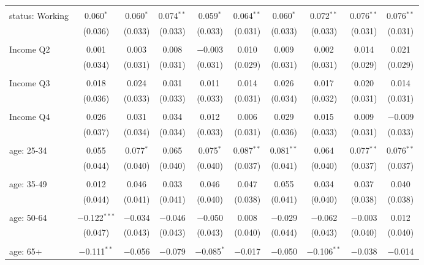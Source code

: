 \begin{tabular}{@{\extracolsep{5pt}}lccccccccc}
  & & & & & & & & & \\ 
 status: Working & 0.060$^{*}$ & 0.060$^{*}$ & 0.074$^{**}$ & 0.059$^{*}$ & 0.064$^{**}$ & 0.060$^{*}$ & 0.072$^{**}$ & 0.076$^{**}$ & 0.076$^{**}$ \\ 
  & (0.036) & (0.033) & (0.033) & (0.033) & (0.031) & (0.033) & (0.033) & (0.031) & (0.031) \\ 
  & & & & & & & & & \\ 
 Income Q2 & 0.001 & 0.003 & 0.008 & $-$0.003 & 0.010 & 0.009 & 0.002 & 0.014 & 0.021 \\ 
  & (0.034) & (0.031) & (0.031) & (0.031) & (0.029) & (0.031) & (0.031) & (0.029) & (0.029) \\ 
  & & & & & & & & & \\ 
 Income Q3 & 0.018 & 0.024 & 0.031 & 0.011 & 0.014 & 0.026 & 0.017 & 0.020 & 0.014 \\ 
  & (0.036) & (0.033) & (0.033) & (0.033) & (0.031) & (0.034) & (0.032) & (0.031) & (0.031) \\ 
  & & & & & & & & & \\ 
 Income Q4 & 0.026 & 0.031 & 0.034 & 0.012 & 0.006 & 0.029 & 0.015 & 0.009 & $-$0.009 \\ 
  & (0.037) & (0.034) & (0.034) & (0.033) & (0.031) & (0.036) & (0.033) & (0.031) & (0.033) \\ 
  & & & & & & & & & \\ 
 age: 25-34 & 0.055 & 0.077$^{*}$ & 0.065 & 0.075$^{*}$ & 0.087$^{**}$ & 0.081$^{**}$ & 0.064 & 0.077$^{**}$ & 0.076$^{**}$ \\ 
  & (0.044) & (0.040) & (0.040) & (0.040) & (0.037) & (0.041) & (0.040) & (0.037) & (0.037) \\ 
  & & & & & & & & & \\ 
 age: 35-49 & 0.012 & 0.046 & 0.033 & 0.046 & 0.047 & 0.055 & 0.034 & 0.037 & 0.040 \\ 
  & (0.044) & (0.041) & (0.041) & (0.040) & (0.038) & (0.041) & (0.040) & (0.038) & (0.038) \\ 
  & & & & & & & & & \\ 
 age: 50-64 & $-$0.122$^{***}$ & $-$0.034 & $-$0.046 & $-$0.050 & 0.008 & $-$0.029 & $-$0.062 & $-$0.003 & 0.012 \\ 
  & (0.047) & (0.043) & (0.043) & (0.043) & (0.040) & (0.044) & (0.043) & (0.040) & (0.040) \\ 
  & & & & & & & & & \\ 
 age: 65+ & $-$0.111$^{**}$ & $-$0.056 & $-$0.079 & $-$0.085$^{*}$ & $-$0.017 & $-$0.050 & $-$0.106$^{**}$ & $-$0.038 & $-$0.014 \\ 

\end{tabular}
